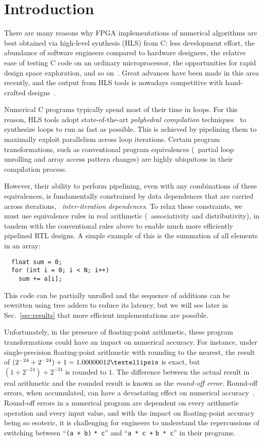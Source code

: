 \section{Introduction}
\label{sec:introduction}

There are many reasons why FPGA implementations of numerical algorithms
are best obtained via high-level synthesis (HLS) from C\@: less
development effort, the abundance of software engineers compared to
hardware designers, the relative ease of testing C code on an ordinary
microprocessor, the opportunities for rapid design space exploration, and
so on~\cite{meeus12}. Great advances have been made in this area recently,
and the output from HLS tools is nowadays competitive with hand-crafted
designs~\cite{bdti_xilinx}.

Numerical C programs typically spend most of their time in loops.  For this
reason, HLS tools adopt state-of-the-art \emph{polyhedral compilation}
techniques~\cite{canis14} to synthesize loops to run as fast as possible.  This
is achieved by pipelining them to maximally exploit parallelism across loop
iterations.  Certain program transformations, such as conventional program
equivalences (\eg~partial loop unrolling and array access pattern changes) are
highly ubiquitous in their compilation process.

However, their ability to perform pipelining, even with any combinations of
these equivalences, is fundamentally constrained by data dependences that
are carried across iterations, \ie~\emph{inter-iteration dependences}.  To
relax these constraints, we must use equivalence rules in real arithmetic
(\eg~associativity and distributivity), in tandem with the conventional rules
above to enable much more efficiently pipelined RTL designs.  A simple example
of this is the summation of all elements in an array:
\begin{lstlisting}
  float sum = 0;
  for (int i = 0; i < N; i++)
    sum += a[i];
\end{lstlisting}
This code can be partially unrolled and the sequence of additions can be
rewritten using tree adders to reduce its latency, but we will see later in
Sec.~\ref{sec:results} that more efficient implementations are possible.

Unfortunately, in the presence of floating-point arithmetic, these program
transformations could have an impact on numerical accuracy.  For instance,
under single-precision floating-point arithmetic with rounding to the nearest,
the result of $(2^{-24} + 2^{-24}) + 1 = 1.00000012\textellipsis$ is exact,
but $(1 + 2^{-24}) + 2^{-24}$ is rounded to $1$.  The difference between
the actual result in real arithmetic and the rounded result is known as the
\emph{round-off error}.  Round-off errors, when accumulated, can have a
devastating effect on numerical accuracy~\cite{higham02}.  Round-off errors in
a numerical program are dependent on every arithmetic operation and every input
value, and with the impact on floating-point accuracy being so esoteric, it is
challenging for engineers to understand the repercussions of switching between
``\verb|(a + b)| \verb|* c|'' and ``\verb|a * c +| \verb|b * c|'' in their
programs.

